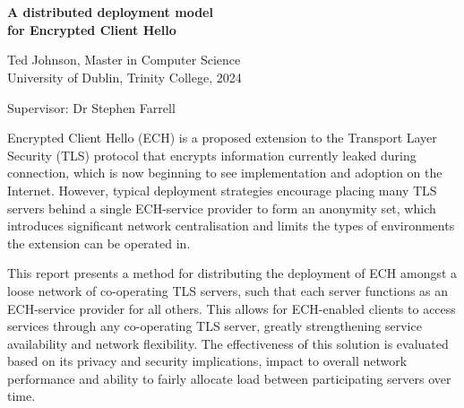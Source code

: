 \chapter*{}
\thispagestyle{empty}

\vspace*{0mm}
\begin{center}
\setlength{\unitlength}{1mm}

\begin{spacing}{2}
\textbf{\Large A distributed deployment model \\ for Encrypted Client Hello} \\[10mm]
\end{spacing}

\begin{spacing}{1.5}
Ted Johnson, Master in Computer Science \\
University of Dublin, Trinity College, 2024 \\[10mm]
\end{spacing}

Supervisor: Dr Stephen Farrell \\
\end{center}
\vspace{5mm}

\begin{spacing}{1} \noindent
Encrypted Client Hello (ECH) is a proposed extension to the Transport Layer Security (TLS) protocol that encrypts information currently leaked during connection, which is now beginning to see implementation and adoption on the Internet. However, typical deployment strategies encourage placing many TLS servers behind a single ECH-service provider to form an anonymity set, which introduces significant network centralisation and limits the types of environments the extension can be operated in.

This report presents a method for distributing the deployment of ECH amongst a loose network of co-operating TLS servers, such that each server functions as an ECH-service provider for all others. This allows for ECH-enabled clients to access services through any co-operating TLS server, greatly strengthening service availability and network flexibility. The effectiveness of this solution is evaluated based on its privacy and security implications, impact to overall network performance and ability to fairly allocate load between participating servers over time.
\end{spacing}
